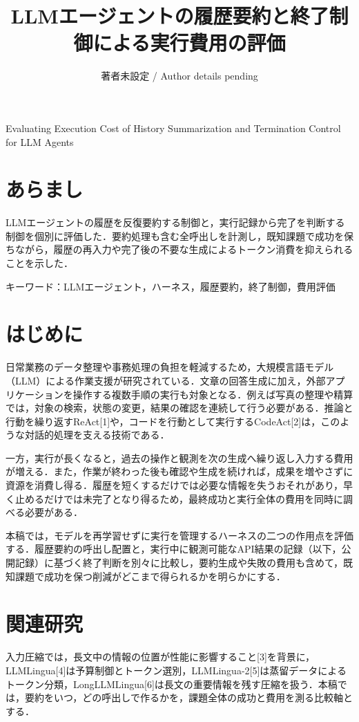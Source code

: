 \documentclass{article}
\title{LLMエージェントの履歴要約と終了制御による実行費用の評価}
\author{著者未設定 / Author details pending}
\date{}
\begin{document}
\maketitle
Evaluating Execution Cost of History Summarization and Termination Control for LLM Agents

\section*{あらまし}
LLMエージェントの履歴を反復要約する制御と，実行記録から完了を判断する制御を個別に評価した．要約処理も含む全呼出しを計測し，既知課題で成功を保ちながら，履歴の再入力や完了後の不要な生成によるトークン消費を抑えられることを示した．

\noindent キーワード：LLMエージェント，ハーネス，履歴要約，終了制御，費用評価





\section{はじめに}
日常業務のデータ整理や事務処理の負担を軽減するため，大規模言語モデル（LLM）による作業支援が研究されている．文章の回答生成に加え，外部アプリケーションを操作する複数手順の実行も対象となる．例えば写真の整理や精算では，対象の検索，状態の変更，結果の確認を連続して行う必要がある．推論と行動を繰り返すReAct[1]や，コードを行動として実行するCodeAct[2]は，このような対話的処理を支える技術である．

一方，実行が長くなると，過去の操作と観測を次の生成へ繰り返し入力する費用が増える．また，作業が終わった後も確認や生成を続ければ，成果を増やさずに資源を消費し得る．履歴を短くするだけでは必要な情報を失うおそれがあり，早く止めるだけでは未完了となり得るため，最終成功と実行全体の費用を同時に調べる必要がある．

本稿では，モデルを再学習せずに実行を管理するハーネスの二つの作用点を評価する．履歴要約の呼出し配置と，実行中に観測可能なAPI結果の記録（以下，公開記録）に基づく終了判断を別々に比較し，要約生成や失敗の費用も含めて，既知課題で成功を保つ削減がどこまで得られるかを明らかにする．

\section{関連研究}
入力圧縮では，長文中の情報の位置が性能に影響すること[3]を背景に，LLMLingua[4]は予算制御とトークン選別，LLMLingua-2[5]は蒸留データによるトークン分類，LongLLMLingua[6]は長文の重要情報を残す圧縮を扱う．本稿では，要約をいつ，どの呼出しで作るかを，課題全体の成功と費用を測る比較軸とする．
\end{document}

